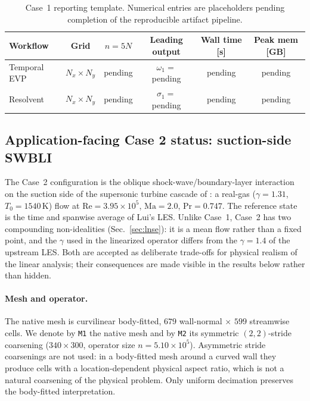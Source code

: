 \documentclass[11pt]{article}
\begin{document}
\begin{table}[t]
\centering
\small
\begin{tabular}{lccccc}
\toprule
Workflow & Grid & $n = 5N$ & Leading output & Wall time [s] & Peak mem [GB] \\
\midrule
Temporal EVP & $N_x \times N_y$ & pending & $\omega_1 =$ pending & pending & pending \\
Resolvent    & $N_x \times N_y$ & pending & $\sigma_1 =$ pending & pending & pending \\
\bottomrule
\end{tabular}
\caption{Case~1 reporting template. Numerical entries are placeholders
pending completion of the reproducible artifact pipeline.}
\label{tab:case1}
\end{table}

\subsection{Application-facing Case 2 status: suction-side SWBLI}
\label{sec:case2}

The Case~2 configuration is the oblique shock-wave/boundary-layer
interaction on the suction side of the supersonic turbine cascade of
\citet{lui2022unsteadiness}: a real-gas ($\gamma = 1.31$,
$T_0 = 1540\,\text{K}$) flow at $\mathrm{Re}=3.95\times 10^5$,
$\mathrm{Ma}=2.0$, $\mathrm{Pr}=0.747$. The reference state is the
time and spanwise average of Lui's LES. Unlike Case~1, Case~2 has
two compounding non-idealities (Sec.~\ref{sec:lnse}): it is a mean
flow rather than a fixed point, and the $\gamma$ used in the
linearized operator differs from the $\gamma=1.4$ of the upstream
LES. Both are accepted as deliberate trade-offs for physical realism
of the linear analysis; their consequences are made visible in the
results below rather than hidden.

\paragraph{Mesh and operator.} The native mesh is curvilinear
body-fitted, $679$ wall-normal $\times$ $599$ streamwise cells. We
denote by \texttt{M1} the native mesh and by \texttt{M2} its
symmetric $(2,2)$-stride coarsening ($340 \times 300$, operator size
$n = 5.10\times 10^5$). Asymmetric stride coarsenings are not used:
in a body-fitted mesh around a curved wall they produce cells with a
location-dependent physical aspect ratio, which is not a natural
coarsening of the physical problem. Only uniform decimation
preserves the body-fitted interpretation.
\end{document}
